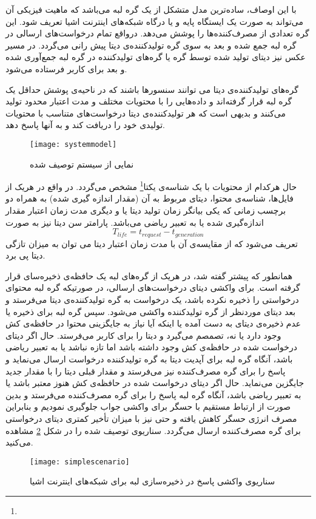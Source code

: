 با این اوصاف، ساده‌ترین مدل متشکل از یک گره لبه می‌باشد که ماهیت فیزیکی آن می‌تواند به صورت یک ایستگاه پایه و یا درگاه شبکه‌های اینترنت اشیا تعریف شود. این گره تعدادی از مصرف‌کننده‌ها را پوشش می‌دهد. درواقع تمام درخواست‌های ارسالی در گره لبه جمع شده و بعد به سوی گره تولیدکننده‌ی دیتا پیش رانی می‌گردد. در مسیر عکس نیز دیتای تولید شده توسط گره یا گره‌های تولیدکننده در گره لبه جمع‌آوری شده و بعد برای کاربر فرستاده می‌شود.

گره‌های تولیدکننده‌ی دیتا می توانند سنسورها باشند که در ناحیه‌ی پوشش حداقل یک گره لبه قرار گرفته‌اند و داده‌هایی را با محتویات مختلف و مدت اعتبار محدود تولید می‌کنند و بدیهی است که هر تولیدکننده‌ی دیتا درخواست‌های متناسب با محتویات تولیدی خود را دریافت کند و به آنها پاسخ دهد.

\begin{figure}[ht]
	\centerline{\texttt{[image: systemmodel]}}
	\caption{نمایی از سیستم توصیف شده \cite{yao2020caching}}
	\label{fig:systemmodel}
\end{figure}

حال هرکدام از محتویات با یک شناسه‌ی یکتا\footnote{} مشخص می‌گردد. در واقع در هریک از فایل‌ها، شناسه‌ی محتوا، دیتای مربوط به آن (مقدار اندازه گیری شده) به همراه دو برچسب زمانی که یکی بیانگر زمان تولید دیتا یا  و دیگری مدت زمان اعتبار مقدار اندازه‌گیری شده یا به تعبیر ریاضی  می‌باشد. پارامتر سن دیتا نیز به صورت 
\begin{equation}\label{eq3}
	T_{life} = t_{request} - t_{generation}
\end{equation}
 تعریف می‌شود که از مقایسه‌ی آن با مدت زمان اعتبار دیتا می توان به میزان تازگی دیتا پی برد.

همانطور که پیشتر گفته شد، در هریک از گره‌های لبه یک حافظه‌ی ذخیره‌سای قرار گرفته است. برای واکشی دیتای درخواست‌های ارسالی، در صورتیکه گره لبه محتوای درخواستی را ذخیره نکرده باشد، یک درخواست به گره تولیدکننده‌ی دیتا می‌فرستد و بعد دیتای موردنظر از گره تولیدکننده واکشی می‌شود. سپس گره لبه برای ذخیره یا عدم ذخیره‌ی دیتای به دست آمده یا اینکه آیا نیاز به جایگزینی محتوا در حافظه‌ی کش وجود دارد یا نه، تصمصم می‌گیرد و دیتا را برای کاربر می‌فرستد. حال اگر دیتای درخواست شده در حافظه‌ی کش وجود داشته باشد اما تازه نباشد یا به تعبیر ریاضی  باشد، آنگاه گره لبه برای آپدیت دیتا به گره تولیدکننده درخواست ارسال می‌نماید و پاسخ را برای گره مصرف‌کننده نیز می‌فرستد و مقدار قبلی دیتا را با مقدار جدید جایگزین می‌نماید. حال اگر دیتای درخواست شده در حافظه‌ی کش هنوز معتبر باشد یا به تعبیر ریاضی  باشد، آنگاه گره لبه پاسخ را برای گره مصرف‌کننده می‌فرستد و بدین صورت از ارتباط مستقیم با حسگر برای واکشی جواب جلوگیری نمودیم و بنابراین مصرف انرژی حسگر کاهش یافته و حتی نیز با میزان تأخیر کمتری دیتای درخواستی برای گره مصرف‌کننده ارسال می‌گردد. سناریوی توصیف شده را در شکل \ref{fig:simplescenario} مشاهده می‌کنید.
\begin{figure}[ht]
	\centerline{\texttt{[image: simplescenario]}}
	\caption{سناریوی واکشی پاسخ در ذخیره‌سازی لبه برای شبکه‌های اینترنت اشیا\cite{cachingtransientdata2018}}
	\label{fig:simplescenario}
\end{figure}

